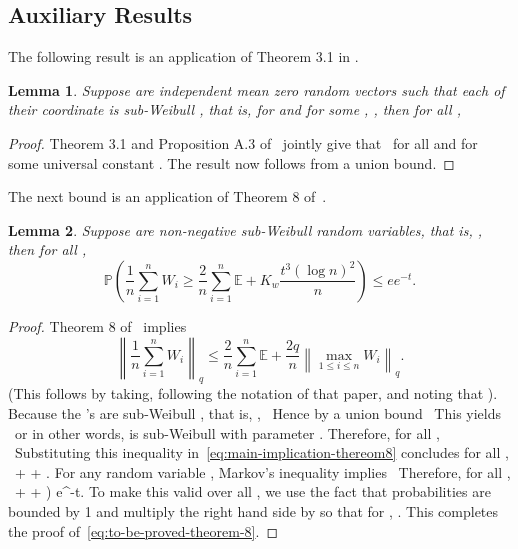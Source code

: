 \documentclass{article}
\newtheorem{lemma}{Lemma}
\begin{document}
\begin{appendices}
\section{Auxiliary Results}
\label{appendix:auxiliary}
The following result is an application of Theorem 3.1 in \cite{KuchAbhi17}.
\begin{lemma}\label{lemma:Thm3.1.KuchAbhi}
Suppose   are independent mean zero random vectors such that each of their coordinate is sub-Weibull , that is,   for   and for
some  , , then for all  ,
\ \end{lemma}
\begin{proof}
Theorem 3.1 and Proposition A.3 of~\cite{KuchAbhi17} jointly give that
\ for all   and for some universal constant  . The result now follows from a union bound.
\end{proof}
The next bound is an application of Theorem 8 of~\cite{Bouch05}.
\begin{lemma}\label{lem:application-theorem8}
Suppose   are non-negative sub-Weibull  random variables, that is,  , then for all  ,
\begin{equation}\label{eq:to-be-proved-theorem-8}
\mathbb{P}\left(\frac{1}{n}\sum_{i=1}^n W_i \ge \frac{2}{n}\sum_{i=1}^n \mathbb{E} + K_w\frac{t^3(\log n)^2}{n}\right) \le ee^{-t}.
\end{equation}
\end{lemma}
\begin{proof}
Theorem 8 of~\cite{Bouch05} implies
\begin{equation}\label{eq:main-implication-thereom8}
\left\|\frac{1}{n}\sum_{i=1}^n W_i\right\|_q \le \frac{2}{n}\sum_{i=1}^n \mathbb{E} + \frac{2q}{n}\left\|\max_{1\le i\le n} W_i\right\|_q.
\end{equation}
(This follows by taking, following the notation of that paper,   and noting that  ). Because the  's are sub-Weibull , that is,  ,
\ Hence by a union bound
\ This yields
\ or in other words,   is sub-Weibull  with parameter  . Therefore, for all  ,
\ Substituting this inequality in~\eqref{eq:main-implication-thereom8} concludes for all  ,
\ +  + .
\]
For any random variable  , Markov's inequality implies
\ Therefore, for all  ,
\ +  + \right) \le e^{-t}.
\]
To make this valid over all  , we use the fact that probabilities are bounded by 1 and multiply the right hand side by   so that for  ,  . This completes the proof of~\eqref{eq:to-be-proved-theorem-8}.
\end{proof}
\end{appendices}
\end{document}
